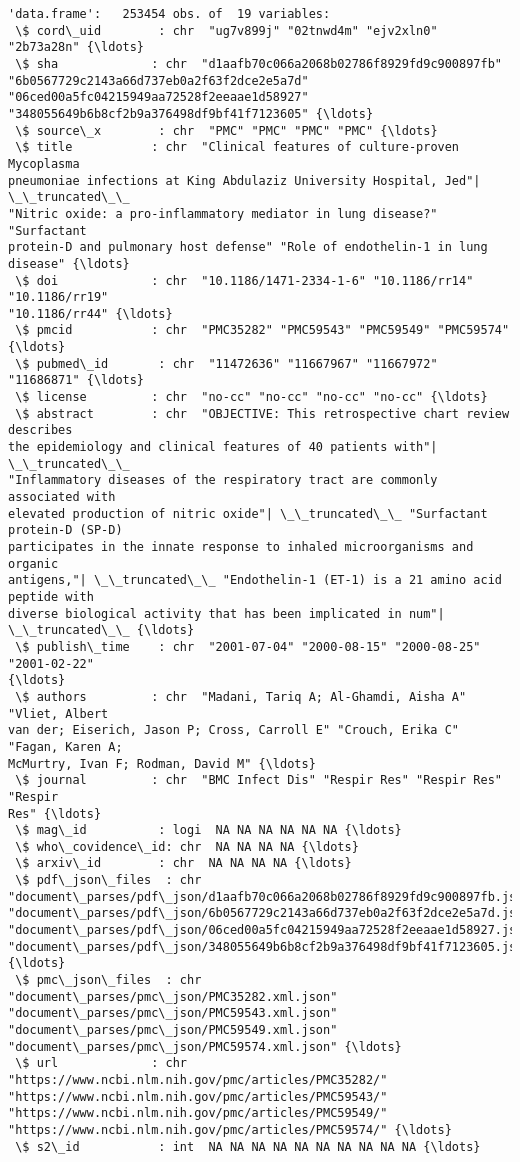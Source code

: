 \documentclass[10pt, a4paper]{article}
\begin{document}
    \begin{Verbatim}[commandchars=\\\{\}]
'data.frame':   253454 obs. of  19 variables:
 \$ cord\_uid        : chr  "ug7v899j" "02tnwd4m" "ejv2xln0" "2b73a28n" {\ldots}
 \$ sha             : chr  "d1aafb70c066a2068b02786f8929fd9c900897fb"
"6b0567729c2143a66d737eb0a2f63f2dce2e5a7d"
"06ced00a5fc04215949aa72528f2eeaae1d58927"
"348055649b6b8cf2b9a376498df9bf41f7123605" {\ldots}
 \$ source\_x        : chr  "PMC" "PMC" "PMC" "PMC" {\ldots}
 \$ title           : chr  "Clinical features of culture-proven Mycoplasma
pneumoniae infections at King Abdulaziz University Hospital, Jed"| \_\_truncated\_\_
"Nitric oxide: a pro-inflammatory mediator in lung disease?" "Surfactant
protein-D and pulmonary host defense" "Role of endothelin-1 in lung disease" {\ldots}
 \$ doi             : chr  "10.1186/1471-2334-1-6" "10.1186/rr14" "10.1186/rr19"
"10.1186/rr44" {\ldots}
 \$ pmcid           : chr  "PMC35282" "PMC59543" "PMC59549" "PMC59574" {\ldots}
 \$ pubmed\_id       : chr  "11472636" "11667967" "11667972" "11686871" {\ldots}
 \$ license         : chr  "no-cc" "no-cc" "no-cc" "no-cc" {\ldots}
 \$ abstract        : chr  "OBJECTIVE: This retrospective chart review describes
the epidemiology and clinical features of 40 patients with"| \_\_truncated\_\_
"Inflammatory diseases of the respiratory tract are commonly associated with
elevated production of nitric oxide"| \_\_truncated\_\_ "Surfactant protein-D (SP-D)
participates in the innate response to inhaled microorganisms and organic
antigens,"| \_\_truncated\_\_ "Endothelin-1 (ET-1) is a 21 amino acid peptide with
diverse biological activity that has been implicated in num"| \_\_truncated\_\_ {\ldots}
 \$ publish\_time    : chr  "2001-07-04" "2000-08-15" "2000-08-25" "2001-02-22"
{\ldots}
 \$ authors         : chr  "Madani, Tariq A; Al-Ghamdi, Aisha A" "Vliet, Albert
van der; Eiserich, Jason P; Cross, Carroll E" "Crouch, Erika C" "Fagan, Karen A;
McMurtry, Ivan F; Rodman, David M" {\ldots}
 \$ journal         : chr  "BMC Infect Dis" "Respir Res" "Respir Res" "Respir
Res" {\ldots}
 \$ mag\_id          : logi  NA NA NA NA NA NA {\ldots}
 \$ who\_covidence\_id: chr  NA NA NA NA {\ldots}
 \$ arxiv\_id        : chr  NA NA NA NA {\ldots}
 \$ pdf\_json\_files  : chr
"document\_parses/pdf\_json/d1aafb70c066a2068b02786f8929fd9c900897fb.json"
"document\_parses/pdf\_json/6b0567729c2143a66d737eb0a2f63f2dce2e5a7d.json"
"document\_parses/pdf\_json/06ced00a5fc04215949aa72528f2eeaae1d58927.json"
"document\_parses/pdf\_json/348055649b6b8cf2b9a376498df9bf41f7123605.json" {\ldots}
 \$ pmc\_json\_files  : chr  "document\_parses/pmc\_json/PMC35282.xml.json"
"document\_parses/pmc\_json/PMC59543.xml.json"
"document\_parses/pmc\_json/PMC59549.xml.json"
"document\_parses/pmc\_json/PMC59574.xml.json" {\ldots}
 \$ url             : chr  "https://www.ncbi.nlm.nih.gov/pmc/articles/PMC35282/"
"https://www.ncbi.nlm.nih.gov/pmc/articles/PMC59543/"
"https://www.ncbi.nlm.nih.gov/pmc/articles/PMC59549/"
"https://www.ncbi.nlm.nih.gov/pmc/articles/PMC59574/" {\ldots}
 \$ s2\_id           : int  NA NA NA NA NA NA NA NA NA NA {\ldots}
    \end{Verbatim}
    
\end{document}
